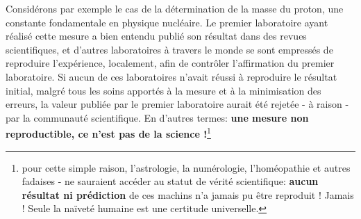 Considérons par exemple le cas de la détermination de la masse du proton, une constante fondamentale en physique nucléaire. Le premier laboratoire ayant réalisé cette mesure a bien entendu publié son résultat dans des revues scientifiques, et d'autres laboratoires à travers le monde se sont empressés de reproduire l'expérience, localement, afin de contrôler l'affirmation du premier laboratoire. Si aucun de ces laboratoires n'avait réussi à reproduire le résultat initial, malgré tous les soins apportés à la mesure et à la minimisation des erreurs, la valeur publiée par le premier laboratoire aurait été rejetée - à raison - par la communauté scientifique. En d'autres termes: \textbf{une mesure non reproductible, ce n'est pas de la science !}\footnote{pour cette simple raison, l'astrologie, la numérologie, l'homéopathie et autres fadaises - ne sauraient accéder au statut de vérité scientifique: \textbf{aucun résultat ni prédiction} de ces machins n'a jamais pu être reproduit ! Jamais ! Seule la naïveté humaine est une certitude universelle.}